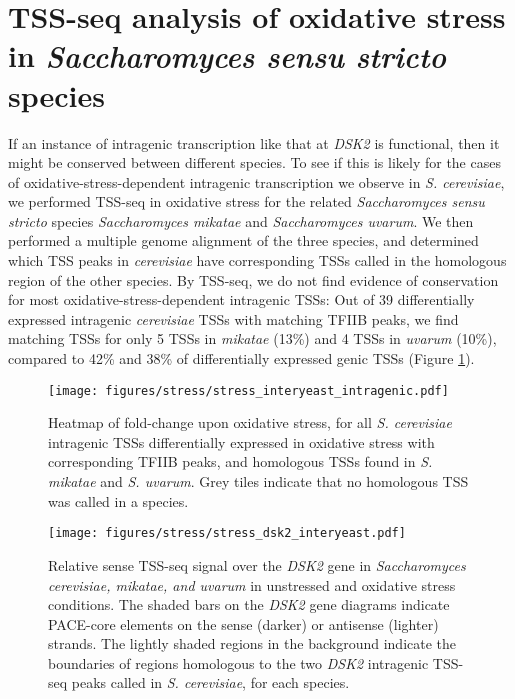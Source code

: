 \section{TSS-seq analysis of oxidative stress in \textit{Saccharomyces sensu stricto} species}

If an instance of intragenic transcription like that at \textit{DSK2} is functional, then it might be conserved between different species.
To see if this is likely for the cases of oxidative-stress-dependent intragenic transcription we observe in \textit{S. cerevisiae}, we performed TSS-seq in oxidative stress for the related \textit{Saccharomyces sensu stricto} species \textit{Saccharomyces mikatae} and \textit{Saccharomyces uvarum}.
We then performed a multiple genome alignment of the three species, and determined which TSS peaks in \textit{cerevisiae} have corresponding TSSs called in the homologous region of the other species.
By TSS-seq, we do not find evidence of conservation for most oxidative-stress-dependent intragenic TSSs: Out of 39 differentially expressed intragenic \textit{cerevisiae} TSSs with matching TFIIB peaks, we find matching TSSs for only 5 TSSs in \textit{mikatae} (13\%) and 4 TSSs in \textit{uvarum} (10\%), compared to 42\% and 38\% of differentially expressed genic TSSs (Figure \ref{fig:stress_interyeast_intragenic}).

\begin{figure}
    \texttt{[image: figures/stress/stress\_interyeast\_intragenic.pdf]}
    \caption[Heatmap of fold-change upon oxidative stress, for \textit{S. cerevisiae} intragenic TSSs differentially expressed in oxidative stress, and homologous TSSs found in \textit{S. mikatae} and \textit{S. uvarum}.]{Heatmap of fold-change upon oxidative stress, for all \textit{S. cerevisiae} intragenic TSSs differentially expressed in oxidative stress with corresponding TFIIB peaks, and homologous TSSs found in \textit{S. mikatae} and \textit{S. uvarum}. Grey tiles indicate that no homologous TSS was called in a species.}
    \label{fig:stress_interyeast_intragenic}
\end{figure}

\begin{figure}
    \texttt{[image: figures/stress/stress\_dsk2\_interyeast.pdf]}
    \caption[Sense TSS-seq signal over the \textit{DSK2} gene in \textit{Saccharomyces cerevisiae, mikatae, and uvarum} in unstressed and oxidative stress conditions.]{Relative sense TSS-seq signal over the \textit{DSK2} gene in \textit{Saccharomyces cerevisiae, mikatae, and uvarum} in unstressed and oxidative stress conditions. The shaded bars on the \textit{DSK2} gene diagrams indicate PACE-core elements on the sense (darker) or antisense (lighter) strands. The lightly shaded regions in the background indicate the boundaries of regions homologous to the two \textit{DSK2} intragenic TSS-seq peaks called in \textit{S. cerevisiae}, for each species.}
    \label{fig:stress_dsk2_interyeast}
\end{figure}

